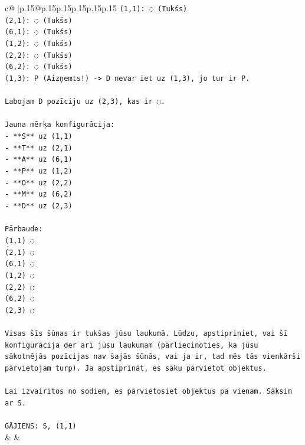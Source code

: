 \documentclass{article}
\begin{document}
{\begin{supertabular}{c@{$\;$}|p{.15\linewidth}@{}p{.15\linewidth}p{.15\linewidth}p{.15\linewidth}p{.15\linewidth}p{.15\linewidth}}
{{{\texttt{(1,1): ◌ (Tukšs)} \\
\texttt{(2,1): ◌ (Tukšs)} \\
\texttt{(6,1): ◌ (Tukšs)} \\
\texttt{(1,2): ◌ (Tukšs)} \\
\texttt{(2,2): ◌ (Tukšs)} \\
\texttt{(6,2): ◌ (Tukšs)} \\
\texttt{(1,3): P (Aizņemts!) {-}> D nevar iet uz (1,3), jo tur ir P.} \\
\\ 
\texttt{Labojam D pozīciju uz (2,3), kas ir ◌.} \\
\\ 
\texttt{Jauna mērķa konfigurācija:} \\
\texttt{{-} **S** uz (1,1)} \\
\texttt{{-} **T** uz (2,1)} \\
\texttt{{-} **A** uz (6,1)} \\
\texttt{{-} **P** uz (1,2)} \\
\texttt{{-} **O** uz (2,2)} \\
\texttt{{-} **M** uz (6,2)} \\
\texttt{{-} **D** uz (2,3)} \\
\\ 
\texttt{Pārbaude:} \\
\texttt{(1,1) ◌} \\
\texttt{(2,1) ◌} \\
\texttt{(6,1) ◌} \\
\texttt{(1,2) ◌} \\
\texttt{(2,2) ◌} \\
\texttt{(6,2) ◌} \\
\texttt{(2,3) ◌} \\
\\ 
\texttt{Visas šīs šūnas ir tukšas jūsu laukumā. Lūdzu, apstipriniet, vai šī konfigurācija der arī jūsu laukumam (pārliecinoties, ka jūsu sākotnējās pozīcijas nav šajās šūnās, vai ja ir, tad mēs tās vienkārši pārvietojam turp). Ja apstiprināt, es sāku pārvietot objektus.} \\
\\ 
\texttt{Lai izvairītos no sodiem, es pārvietosiet objektus pa vienam. Sāksim ar S.} \\
\\ 
\texttt{GĀJIENS: S, (1,1)} \\
            }
        }
    }
    & & \\ \\


\end{supertabular}}
\end{document}
